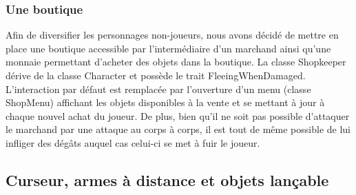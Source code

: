 \documentclass[10pt,a4paper]{article}
\begin{document}
\subsubsection{Une boutique}
Afin de diversifier les personnages non-joueurs, nous avons décidé de mettre en place une boutique accessible par l'intermédiaire d'un marchand ainsi qu'une monnaie permettant d'acheter des objets dans la boutique. La classe Shopkeeper dérive de la classe Character et possède le trait FleeingWhenDamaged. L'interaction par défaut est remplacée par l'ouverture d'un menu (classe ShopMenu) affichant les objets disponibles à la vente et se mettant à jour à chaque nouvel achat du joueur. De plus, bien qu'il ne soit pas possible d'attaquer le marchand par une attaque au corps à corps, il est tout de même possible de lui infliger des dégâts auquel cas celui-ci se met à fuir le joueur.

\subsection{Curseur, armes à distance et objets lançable}
\end{document}
